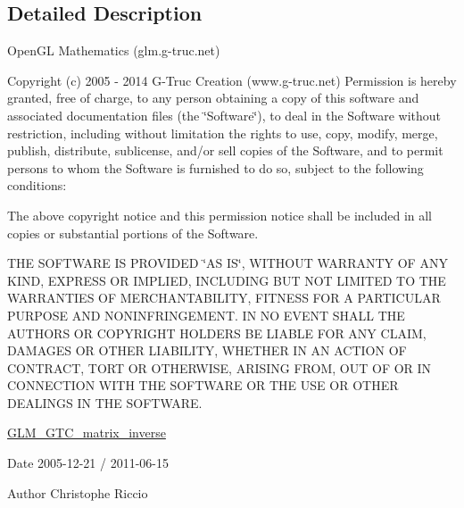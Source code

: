 \subsection{Detailed Description}
Open\+GL Mathematics (glm.\+g-\/truc.\+net)

Copyright (c) 2005 -\/ 2014 G-\/\+Truc Creation (www.\+g-\/truc.\+net) Permission is hereby granted, free of charge, to any person obtaining a copy of this software and associated documentation files (the \char`\"{}\+Software\char`\"{}), to deal in the Software without restriction, including without limitation the rights to use, copy, modify, merge, publish, distribute, sublicense, and/or sell copies of the Software, and to permit persons to whom the Software is furnished to do so, subject to the following conditions\+:

The above copyright notice and this permission notice shall be included in all copies or substantial portions of the Software.

T\+HE S\+O\+F\+T\+W\+A\+RE IS P\+R\+O\+V\+I\+D\+ED \char`\"{}\+A\+S I\+S\char`\"{}, W\+I\+T\+H\+O\+UT W\+A\+R\+R\+A\+N\+TY OF A\+NY K\+I\+ND, E\+X\+P\+R\+E\+SS OR I\+M\+P\+L\+I\+ED, I\+N\+C\+L\+U\+D\+I\+NG B\+UT N\+OT L\+I\+M\+I\+T\+ED TO T\+HE W\+A\+R\+R\+A\+N\+T\+I\+ES OF M\+E\+R\+C\+H\+A\+N\+T\+A\+B\+I\+L\+I\+TY, F\+I\+T\+N\+E\+SS F\+OR A P\+A\+R\+T\+I\+C\+U\+L\+AR P\+U\+R\+P\+O\+SE A\+ND N\+O\+N\+I\+N\+F\+R\+I\+N\+G\+E\+M\+E\+NT. IN NO E\+V\+E\+NT S\+H\+A\+LL T\+HE A\+U\+T\+H\+O\+RS OR C\+O\+P\+Y\+R\+I\+G\+HT H\+O\+L\+D\+E\+RS BE L\+I\+A\+B\+LE F\+OR A\+NY C\+L\+A\+IM, D\+A\+M\+A\+G\+ES OR O\+T\+H\+ER L\+I\+A\+B\+I\+L\+I\+TY, W\+H\+E\+T\+H\+ER IN AN A\+C\+T\+I\+ON OF C\+O\+N\+T\+R\+A\+CT, T\+O\+RT OR O\+T\+H\+E\+R\+W\+I\+SE, A\+R\+I\+S\+I\+NG F\+R\+OM, O\+UT OF OR IN C\+O\+N\+N\+E\+C\+T\+I\+ON W\+I\+TH T\+HE S\+O\+F\+T\+W\+A\+RE OR T\+HE U\+SE OR O\+T\+H\+ER D\+E\+A\+L\+I\+N\+GS IN T\+HE S\+O\+F\+T\+W\+A\+RE.

\hyperlink{group__gtc__matrix__inverse}{G\+L\+M\+\_\+\+G\+T\+C\+\_\+matrix\+\_\+inverse}

\begin{DoxyDate}{Date}
2005-\/12-\/21 / 2011-\/06-\/15 
\end{DoxyDate}
\begin{DoxyAuthor}{Author}
Christophe Riccio 
\end{DoxyAuthor}

